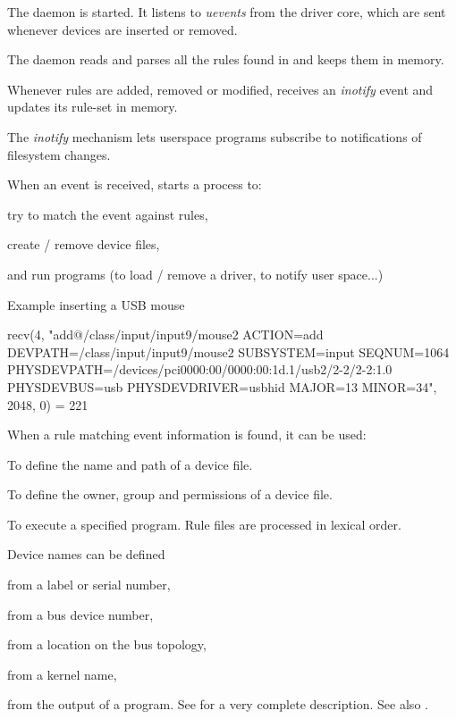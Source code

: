   \startitemize
  \item The  daemon is started.  It listens to {\em uevents}
    from the driver core, which are sent whenever devices are inserted
    or removed.
  \item The  daemon reads and parses all the rules found
    in  and keeps them in memory.
  \item Whenever rules are added, removed or modified, 
    receives an {\em inotify} event and updates its rule-set in memory.
    \startitemize
    \item The {\em inotify} mechanism lets userspace programs
      subscribe to notifications of filesystem changes.
    \item When an event is received,  starts a process to:
      \startitemize
      \item try to match the event against  rules,
      \item create / remove device files,
      \item and run programs (to load / remove a driver, to notify user
        space...)
      \stopitemize
    \stopitemize
  \stopitemize

  Example inserting a USB mouse
  \begin{block}{}
\tiny
\starttyping
recv(4,
     "add@/class/input/input9/mouse2\0
     ACTION=add\0
     DEVPATH=/class/input/input9/mouse2\0
     SUBSYSTEM=input\0
     SEQNUM=1064\0
     PHYSDEVPATH=/devices/pci0000:00/0000:00:1d.1/usb2/2-2/2-2:1.0\0
     PHYSDEVBUS=usb\0
     PHYSDEVDRIVER=usbhid\0
     MAJOR=13\0
     MINOR=34\0",
     2048,
     0)
= 221
\stoptyping
  \end{block}

  When a  rule matching event information is found, it can be
  used:
  \startitemize
  \item To define the name and path of a device file.
  \item To define the owner, group and permissions of a device file.
  \item To execute a specified program.
  \stopitemize
  Rule files are processed in lexical order.

  Device names can be defined
  \startitemize
  \item from a label or serial number,
  \item from a bus device number,
  \item from a location on the bus topology,
  \item from a kernel name,
  \item from the output of a program.
  \stopitemize
See 
for a very complete description. See also .

